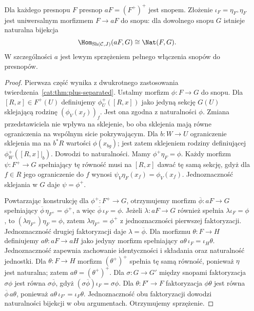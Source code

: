 \begin{twierdzenie}\label{cat:thm:sheafification}
Dla każdego presnopu $F$ presnop $aF=(F^+)^+$ jest snopem. Złożenie $\iota_F=\eta_{F^+}\eta_F$ jest uniwersalnym morfizmem $F\to aF$ do snopu: dla dowolnego snopu $G$ istnieje naturalna bijekcja
\[
 \Hom_{\operatorname{Sh}(\mathcal C,J)}(aF,G)
 \cong\Nat(F,G).
\]
W szczególności $a$ jest lewym sprzężeniem pełnego włączenia snopów do presnopów.
\end{twierdzenie}
\begin{proof}
Pierwsza część wynika z dwukrotnego zastosowania twierdzenia~\ref{cat:thm:plus-separated}. Ustalmy morfizm $\phi:F\to G$ do snopu. Dla $[R,x]\in F^+(U)$ definiujemy $\phi^+_U([R,x])$ jako jedyną sekcję $G(U)$ sklejającą rodzinę $(\phi_V(x_f))_f$. Jest ona zgodna z naturalności $\phi$. Zmiana przedstawiciela nie wpływa na sklejenie, bo oba sklejenia mają równe ograniczenia na wspólnym sicie pokrywającym. Dla $b:W\to U$ ograniczenie sklejenia ma na $b^*R$ wartości $\phi(x_{bg})$; jest zatem sklejeniem rodziny definiującej $\phi^+_W([R,x]|_b)$. Dowodzi to naturalności. Mamy $\phi^+\eta_F=\phi$. Każdy morfizm $\psi:F^+\to G$ spełniający tę równość musi na $[R,x]$ dawać tę samą sekcję, gdyż dla $f\in R$ jego ograniczenie do $f$ wynosi $\psi_V\eta_F(x_f)=\phi_V(x_f)$. Jednoznaczność sklejania w $G$ daje $\psi=\phi^+$.

Powtarzając konstrukcję dla $\phi^+:F^+\to G$, otrzymujemy morfizm $\overline\phi:aF\to G$ spełniający $\overline\phi\,\eta_{F^+}=\phi^+$, a więc $\overline\phi\,\iota_F=\phi$. Jeżeli $\lambda:aF\to G$ również spełnia $\lambda\iota_F=\phi$, to $(\lambda\eta_{F^+})\eta_F=\phi$, zatem $\lambda\eta_{F^+}=\phi^+$ z jednoznaczności pierwszej faktoryzacji. Jednoznaczność drugiej faktoryzacji daje $\lambda=\overline\phi$. Dla morfizmu $\theta:F\to H$ definiujemy $a\theta:aF\to aH$ jako jedyny morfizm spełniający $a\theta\,\iota_F=\iota_H\theta$. Jednoznaczność zapewnia zachowanie identyczności i składania oraz naturalność jednostki. Dla $\theta:F\to H$ morfizm $(\theta^+)^+$ spełnia tę samą równość, ponieważ $\eta$ jest naturalna; zatem $a\theta=(\theta^+)^+$. Dla $\sigma:G\to G'$ między snopami faktoryzacja $\sigma\phi$ jest równa $\sigma\overline\phi$, gdyż $(\sigma\overline\phi)\iota_F=\sigma\phi$. Dla $\theta:F'\to F$ faktoryzacja $\phi\theta$ jest równa $\overline\phi\,a\theta$, ponieważ $a\theta\,\iota_{F'}=\iota_F\theta$. Jednoznaczność obu faktoryzacji dowodzi naturalności bijekcji w obu argumentach. Otrzymujemy sprzężenie.
\end{proof}

